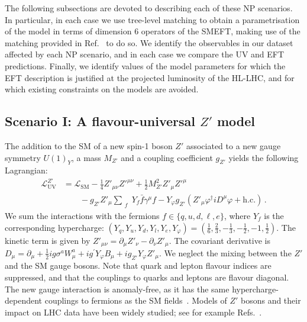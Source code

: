 \documentclass[withindex,glossary]{cam-thesis}
\begin{document}
\noindent The following subsections are devoted to describing each of these NP scenarios.
In particular, in each case we use tree-level matching to obtain a parametrisation of the model in terms of dimension 6 operators of the SMEFT,
making use of the matching provided in Ref.~\cite{deBlas:2017xtg} to do so.
We identify the observables in our dataset affected by each NP scenario, and in each case we compare the UV and EFT predictions.  Finally, we identify values of 
the model parameters for which the EFT description is justified at the projected luminosity of the HL-LHC, and for which existing constraints on the models are avoided.


\subsection{Scenario I: A flavour-universal $Z'$ model}
\label{subsec:model-zprime}

The addition to the SM of a new spin-1 boson $Z'$ associated to a new gauge symmetry $U(1)_Y$, a mass $M_{Z'}$ and a coupling coefficient $g_{Z'}$ yields the following Lagrangian:
\begin{equation} 
\label{eq:Zprime}
	\begin{split}
		\mathcal{L}^{Z'}_{\text{UV}} &= \mathcal{L}_{\text{SM}} - \frac{1}{4} Z'_{\mu \nu} {Z'}^{\mu \nu} + \frac{1}{2} M_{Z'}^{2} Z'_{\mu} {Z'}^{\mu} \\
		&\qquad - g_{Z'} Z'_{\mu} \sum_{\substack{f}} Y_{f} \bar{f} \gamma^{\mu} f - Y_{\varphi} g_{Z'} ( Z'_{\mu} \varphi^{\dagger} i  D^{\mu} \varphi + \textrm{h.c.} ) \, .
	\end{split}
\end{equation}
We sum the interactions with the fermions $f \in \{q, u, d, \ell, e \}$, where $Y_f$ is the corresponding hypercharge: $( Y_{q}, Y_{u}, Y_{d}, Y_{l}, Y_{e}, Y_{\varphi} ) = (\frac{1}{6}, \frac{2}{3}, -\frac{1}{3}, -\frac{1}{2}, -1, \frac{1}{2} ) $. The kinetic term is given by $Z'_{\mu \nu} = \partial_{\mu} Z'_{\nu} - \partial_{\nu} Z'_{\mu}$. The covariant derivative is $D_{\mu} = \partial_{\mu} + \frac{1}{2} ig \sigma^{a} W_{\mu}^{a} + i g^{'} Y_{\varphi} B_{\mu} + i g_{Z'} Y_{\varphi} Z'_{\mu}$. We neglect the mixing between the $Z'$ and the SM gauge bosons.  Note that quark and lepton flavour indices are suppressed, and that the couplings to quarks and leptons are flavour diagonal.
The new gauge interaction is anomaly-free, as it has the same hypercharge-dependent couplings to fermions as the SM fields~\cite{Allanach:2018vjg}.
Models of $Z'$ bosons and their impact on LHC data have been widely studied; see for example Refs.~\cite{Salvioni:2009mt,Salvioni:2009jp,Langacker:2008yv,Panico:2021vav}.
\end{document}
